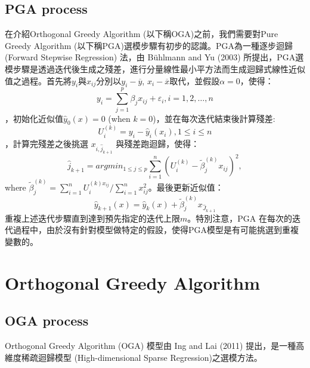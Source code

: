\subsection{PGA process}
在介紹Orthogonal Greedy Algorithm (以下稱OGA)之前，我們需要對Pure Greedy Algorithm (以下稱PGA)選模步驟有初步的認識。PGA為一種逐步迴歸 (Forward Stepwise Regression) 法，由 Bühlmann and Yu (2003) 所提出，PGA選模步驟是透過迭代後生成之殘差，進行分量線性最小平方法而生成迴歸式線性近似值之過程。首先將$y_{i}$與$x_{ij}$分別以$y_{i}-\overline{y}$, $x_{i}-\overline{x}$取代，並假設$\alpha = 0$，使得：
\begin{equation}
\displaystyle y_{i} = \sum_{j=1}^{p} \beta_{j}x_{ij}+\varepsilon_i, i=1,2,\ldots,n 
\end{equation}
，初始化近似值$ \hat{y}_0(x)=0$ (when $k=0$)，並在每次迭代結束後計算殘差:
\begin{equation}
U_i^{(k)}=y_i - \hat{y}_i(x_i),1\leq i \leq n
\end{equation}
，計算完殘差之後挑選 $ x_{i,\hat{j}_{k+1}} $ 與殘差跑迴歸，使得：
\begin{equation}
\displaystyle \hat{j}_{k+1}=argmin_{1\leq j \leq p}\sum_{i=1}^{n}(U_i^{(k)}-\tilde{\beta}_j^{(k)}x_{ij})^2,
\end{equation}
where $\displaystyle \tilde{\beta}_j^{(k)}=\sum_{i=1}^{n} U_i^{(k)x_{ij}} / \sum_{i=1}^{n}x_{ij}^2 $。最後更新近似值：
\begin{equation}
\hat{y}_{k+1}(x)=\hat{y}_{k}(x)+ \tilde{\beta}_j^{(k)}x_{\hat{J}_{k+1}}
\end{equation}
重複上述迭代步驟直到達到預先指定的迭代上限$m$。特別注意，PGA 在每次的迭代過程中，由於沒有針對模型做特定的假設，使得PGA模型是有可能挑選到重複變數的。

\newpage

\section{Orthogonal Greedy Algorithm}
\subsection{OGA process}
Orthogonal Greedy Algorithm (OGA) 模型由 Ing and Lai (2011) 提出，是一種高維度稀疏迴歸模型 (High-dimensional Sparse Regression)之選模方法。

